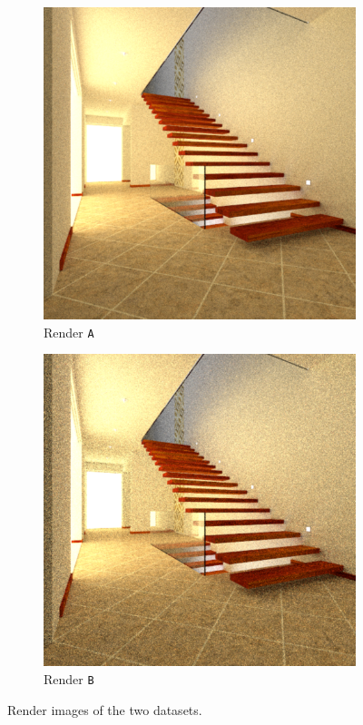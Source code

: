 \begin{figure}
	\centering
	\begin{subfigure}[t]{0.49\linewidth}
		\includegraphics[width=\textwidth]{chapters/chapter_results/a_render.pdf}
		\caption{Render \texttt{A}}
	\end{subfigure}
	\begin{subfigure}[t]{0.49\linewidth}
		\includegraphics[width=\textwidth]{chapters/chapter_results/b_render.pdf}
		\caption{Render \texttt{B}}
	\end{subfigure}

	\caption{Render images of the two datasets.}
	\label{couple1render}
\end{figure}

